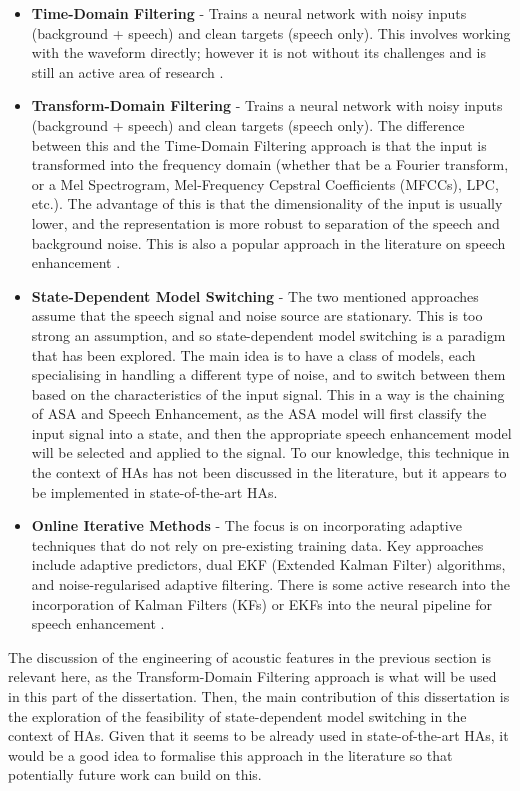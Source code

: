 \documentclass[logo,bsc,singlespacing,parskip,online]{infthesis}
\begin{document}
\begin{itemize}
   \item \textbf{Time-Domain Filtering} - Trains a neural network with noisy inputs (background + speech) and clean targets (speech only). 
   This involves working with the waveform directly; however it is not without its challenges and is still an active area of research \citep{saleem_time_2024}.
   \item \textbf{Transform-Domain Filtering} - Trains a neural network with noisy inputs (background + speech) and clean targets (speech only). 
   The difference between this and the Time-Domain Filtering approach is that the input is transformed into the frequency domain 
   (whether that be a Fourier transform, or a Mel Spectrogram, Mel-Frequency Cepstral Coefficients (MFCCs), LPC, etc.). The advantage of this 
   is that the dimensionality of the input is usually lower, and the representation is more robust to separation of the speech and background noise.
   This is also a popular approach in the literature on speech enhancement \citep{tan18_interspeech,hou_local_2023}.
   \item \textbf{State-Dependent Model Switching} - The two mentioned approaches assume that the speech signal and noise source are stationary. 
   This is too strong an assumption, and so state-dependent model switching is a paradigm that has been explored. The main idea is 
   to have a class of models, each specialising in handling a different type of noise, and to switch between them based on the characteristics of the input signal. This in a way is the chaining of ASA and Speech Enhancement, as the ASA model will first classify the input signal into a state, and then the appropriate speech enhancement model will be selected and applied to the signal.
   To our knowledge, this technique in the context of HAs has not been discussed in the literature, but it 
   appears to be implemented in state-of-the-art HAs. 
   \item \textbf{Online Iterative Methods} - The focus is on incorporating adaptive techniques that do not rely on pre-existing 
   training data. Key approaches include adaptive predictors, dual EKF (Extended Kalman Filter) algorithms, and noise-regularised adaptive filtering.
   There is some active research into the incorporation of Kalman Filters (KFs) or EKFs into the neural pipeline for speech enhancement \citep{Xue2020NeuralKF, Mellahi2023SpeechEU}.
\end{itemize}
The discussion of the engineering of acoustic features in the previous section is relevant here, as the Transform-Domain Filtering approach
is what will be used in this part of the dissertation. 
Then, the main contribution of this dissertation is the exploration of 
the feasibility of state-dependent model switching in the context of HAs. 
Given that it seems to be already used in state-of-the-art HAs, it 
would be a good idea to formalise this approach in the literature 
so that potentially future work can build on this.
\end{document}
